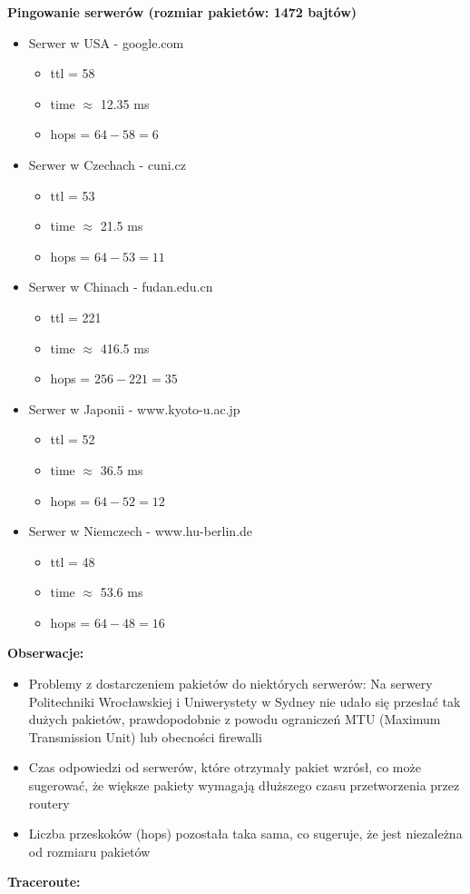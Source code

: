 \documentclass{article}
\begin{document}
\textbf{Pingowanie serwerów (rozmiar pakietów: 1472 bajtów)}
\vspace{1\baselineskip}
\begin{itemize}

    \item Serwer w USA - google.com
    \begin{itemize}
        \item ttl = 58
        \item time $\approx$ 12.35 ms
        \item hops = $64 - 58 = 6$
    \end{itemize}

    \item Serwer w Czechach - cuni.cz 
    \begin{itemize}
        \item ttl = 53
        \item time $\approx$ 21.5 ms
        \item hops = $64 - 53 = 11$
    \end{itemize} 
    \item Serwer w Chinach - fudan.edu.cn 
    \begin{itemize}
        \item ttl = 221
        \item time $\approx$ 416.5 ms
        \item hops = $256 - 221 = 35$
    \end{itemize}
    \item Serwer w Japonii - www.kyoto-u.ac.jp
    \begin{itemize}
        \item ttl = 52
        \item time $\approx$ 36.5 ms
        \item hops = $64 - 52 = 12$
    \end{itemize}
    \item Serwer w Niemczech - www.hu-berlin.de
    \begin{itemize}
        \item ttl = 48
        \item time $\approx$ 53.6 ms
        \item hops = $64 - 48 = 16$
    \end{itemize}
\end{itemize}
\vspace{1\baselineskip}
\textbf{Obserwacje: }
\vspace{1\baselineskip}
\begin{itemize}
    \item Problemy z dostarczeniem pakietów do niektórych serwerów: Na serwery Politechniki Wrocławskiej i Uniwerystety w Sydney nie udało
    się przesłać tak dużych pakietów, prawdopodobnie z powodu ograniczeń MTU (Maximum Transmission Unit) lub obecności firewalli
    \item Czas odpowiedzi od serwerów, które otrzymały pakiet wzrósł, co może sugerować, że większe pakiety wymagają dłuższego czasu
    przetworzenia przez routery
    \item Liczba przeskoków (hops) pozostała taka sama, co sugeruje, że jest niezależna od rozmiaru pakietów
\end{itemize}
\vspace{1\baselineskip}
\textbf{Traceroute: }
\vspace{1\baselineskip}
\end{document}
